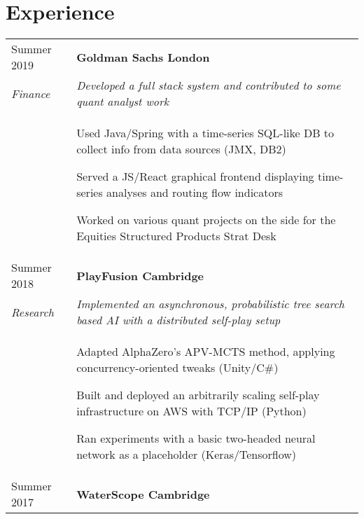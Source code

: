 \documentclass[letterpaper, 10pt]{article}
\begin{document}

\section*{Experience}
\begin{tabularx}{\linewidth}{>{\raggedleft}p{2.2cm}|X}
Summer 2019			& \textbf{Goldman Sachs \hfill London}\\
\textit{Finance}	& \textit{Developed a full stack system and contributed to some quant analyst work}\\
					& \vspace{-.5\baselineskip}\begin{compact}
						\item Used Java/Spring with a time-series SQL-like DB to collect info from data sources (JMX, DB2)
						\item Served a JS/React graphical frontend displaying time-series analyses and routing flow indicators
						\item Worked on various quant projects on the side for the Equities Structured Products Strat Desk
						\vspace{-.5\baselineskip}
					\end{compact}\\
Summer 2018	& \textbf{PlayFusion \hfill Cambridge}\\
\textit{Research}	& \textit{Implemented an asynchronous, probabilistic tree search based AI with a distributed self-play setup}\\
					& \vspace{-.5\baselineskip}\begin{compact}
						\item Adapted AlphaZero's APV-MCTS method, applying concurrency-oriented tweaks (Unity/C\#)
						\item Built and deployed an arbitrarily scaling self-play infrastructure on AWS with TCP/IP (Python)
						\item Ran experiments with a basic two-headed neural network as a placeholder (Keras/Tensorflow)
						\vspace{-.5\baselineskip}
					\end{compact}\\
Summer 2017	& \textbf{WaterScope \hfill Cambridge}\\

\end{tabularx}
\end{document}
